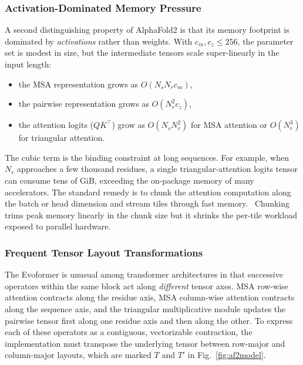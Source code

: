\subsubsection{Activation-Dominated Memory Pressure}
\label{sec:analysis:memory}

A second distinguishing property of AlphaFold2 is that its memory footprint is dominated by \textit{activations} rather than weights. With $c_m, c_z \le 256$, the parameter set is modest in size, but the intermediate tensors scale super-linearly in the input length:
\begin{itemize}
    \item the MSA representation grows as $O(N_s N_r c_m)$,
    \item the pairwise representation grows as $O(N_r^2 c_z)$,
    \item the attention logits ($Q K^\top$) grow as $O(N_s N_r^2)$ for MSA attention or $O(N_r^3)$ for triangular attention.
\end{itemize}

The cubic term is the binding constraint at long sequences. For example, when $N_r$ approaches a few thousand residues, a single triangular-attention logits tensor can consume tens of GiB, exceeding the on-package memory of many accelerators. The standard remedy is to chunk the attention computation along the batch or head dimension and stream tiles through fast memory.~\cite{zhao2024autochunk} Chunking trims peak memory linearly in the chunk size but it shrinks the per-tile workload exposed to parallel hardware.


\subsubsection{Frequent Tensor Layout Transformations}
\label{sec:analysis:comm}

The Evoformer is unusual among transformer architectures in that successive operators within the same block act along \textit{different} tensor axes. MSA row-wise attention contracts along the residue axis, MSA column-wise attention contracts along the sequence axis, and the triangular multiplicative module updates the pairwise tensor first along one residue axis and then along the other. To express each of these operators as a contiguous, vectorizable contraction, the implementation must transpose the underlying tensor between row-major and column-major layouts, which are marked $T$ and $T'$ in Fig.~\ref{fig:af2model}.


